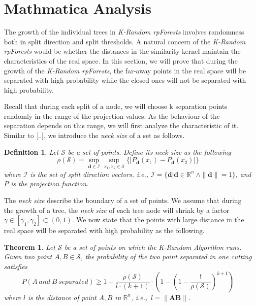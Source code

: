 \section{Mathmatica Analysis}
\newtheorem{defi}{Definition}
\newtheorem{thm}{Theorem}

The growth of the individual trees in \textit{K-Random rpForests} involves randomness both in split direction and split thresholds. A natural concern of the \textit{K-Random rpForests} would be whether the distances in the similarity kernel maintain the characteristics of the real space. In this section, we will prove that during the growth of the \textit{K-Random rpForests}, the far-away points in the real space will be separated with high probability while the closed ones will not be separated with high probability.

Recall that during each split of a node, we will choose k separation points randomly in the range of the projection values. As the behaviour of the separation depends on this range, we will first analyze the characteristic of it. Similar to [..], we introduce the \textit{neck size} of a set as follows.


\begin{defi}
    Let $\mathcal{S}$ be a set of points. Define its neck size as the following
    \begin{equation}
    \nonumber
        \rho(\mathcal{S}) = \sup_{\mathbf{d} \in \mathcal{I}}\sup_{x_1, x_2 \in \mathcal{S}}\{|P_{\mathbf{d}}(x_1) - P_{\mathbf{d}}(x_2)|\}
    \end{equation}
    where $\mathcal{I}$ is the set of split direction vectors, i.e.,  $\mathcal{I} = \{ \mathbf{d} | \mathbf{d} \in \mathbb{R}^n\ \wedge \|\mathbf{d}\| = 1 \}$, and $P$ is the projection function.
\end{defi}

The \textit{neck size} describe the boundary of a set of points. We assume that during the growth of a tree, the \textit{neck size} of each tree node will shrink by a factor $\gamma \in [\gamma_1, \gamma_2] \subset (0, 1)$. We now state that the points with large distance in the real space will be separated with high probability as the following.

\begin{thm}
    Let $\mathcal{S}$ be a set of points on which the K-Random Algorithm runs. Given two point $A, B \in \mathcal{S}$, the probability of the two point separated in one cutting satisfies
    \begin{equation}
    \nonumber
        P(A\ and\ B\ separated) \ge 1 - \frac{\rho(\mathcal{S})}{l \cdot (k+1)} \cdot (1 - (1 - \frac{l}{\rho(\mathcal{S})})^{k+1})
    \end{equation}
    where $l$ is the distance of point $A, B$ in $\mathbb{R}^n$, i.e.,\ $l = \|\mathbf{AB}\|$.
\end{thm}

